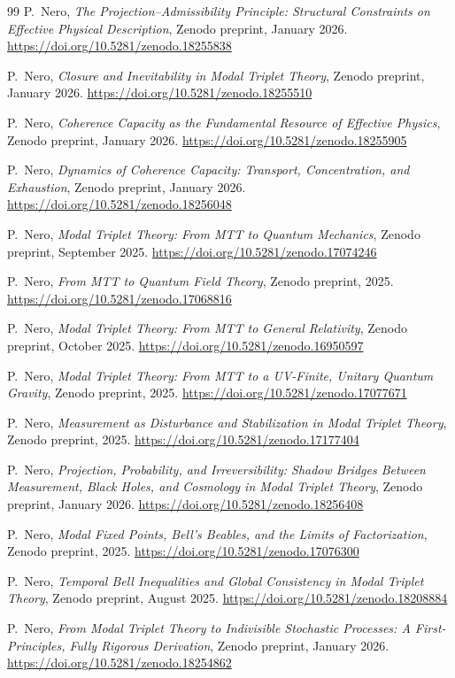 \documentclass[11pt]{article}
\begin{document}
\begin{thebibliography}{99}
P.~Nero,
\emph{The Projection--Admissibility Principle: Structural Constraints on Effective Physical Description},
Zenodo preprint, January 2026.
\url{https://doi.org/10.5281/zenodo.18255838}

P.~Nero,
\emph{Closure and Inevitability in Modal Triplet Theory},
Zenodo preprint, January 2026.
\url{https://doi.org/10.5281/zenodo.18255510}

P.~Nero,
\emph{Coherence Capacity as the Fundamental Resource of Effective Physics},
Zenodo preprint, January 2026.
\url{https://doi.org/10.5281/zenodo.18255905}

P.~Nero,
\emph{Dynamics of Coherence Capacity: Transport, Concentration, and Exhaustion},
Zenodo preprint, January 2026.
\url{https://doi.org/10.5281/zenodo.18256048}

P.~Nero,
\emph{Modal Triplet Theory: From MTT to Quantum Mechanics},
Zenodo preprint, September 2025.
\url{https://doi.org/10.5281/zenodo.17074246}

P.~Nero,
\emph{From MTT to Quantum Field Theory},
Zenodo preprint, 2025.
\url{https://doi.org/10.5281/zenodo.17068816}

P.~Nero,
\emph{Modal Triplet Theory: From MTT to General Relativity},
Zenodo preprint, October 2025.
\url{https://doi.org/10.5281/zenodo.16950597}

P.~Nero,
\emph{Modal Triplet Theory: From MTT to a UV-Finite, Unitary Quantum Gravity},
Zenodo preprint, 2025.
\url{https://doi.org/10.5281/zenodo.17077671}

P.~Nero,
\emph{Measurement as Disturbance and Stabilization in Modal Triplet Theory},
Zenodo preprint, 2025.
\url{https://doi.org/10.5281/zenodo.17177404}

P.~Nero,
\emph{Projection, Probability, and Irreversibility: Shadow Bridges Between Measurement, Black Holes, and Cosmology in Modal Triplet Theory},
Zenodo preprint, January 2026.
\url{https://doi.org/10.5281/zenodo.18256408}

P.~Nero,
\emph{Modal Fixed Points, Bell’s Beables, and the Limits of Factorization},
Zenodo preprint, 2025.
\url{https://doi.org/10.5281/zenodo.17076300}

P.~Nero,
\emph{Temporal Bell Inequalities and Global Consistency in Modal Triplet Theory},
Zenodo preprint, August 2025.
\url{https://doi.org/10.5281/zenodo.18208884}

P.~Nero,
\emph{From Modal Triplet Theory to Indivisible Stochastic Processes: A First-Principles, Fully Rigorous Derivation},
Zenodo preprint, January 2026.
\url{https://doi.org/10.5281/zenodo.18254862}

\end{thebibliography}
\end{document}
